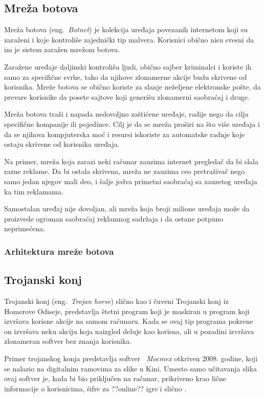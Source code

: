 \documentclass[a4paper]{article}
\begin{document}
\subsection{Mreža botova}

Mreža botova (eng.~{\em Botnet}) je kolekcija uređaja povezanih internetom koji su zaraženi i koje kontroliše zajednički tip malvera. Korisnici obično nisu svesni da im je sistem zaražen mrežom botova.

Zaražene uređaje daljinski kontrolišu ljudi, obično sajber kriminalci i koriste ih samo za specifične svrhe, tako da njihove zlonamerne akcije budu skrivene od korisnika. Mreže botova se obično koriste za slanje neželjene elektronske pošte, da prevare korisnike da posete sajtove koji generišu zlonamerni saobraćaj i druge.

Mreža botova traži i napada nedovoljno zaštićene uređaje, radije nego da cilja specifične kompanije ili pojedince. Cilj je da se mreža proširi na što više uređaja i da se njihova kompjuterska moć i resursi iskoriste za automatske radnje koje ostaju skrivene od korisnika uređaja.

Na primer, mreža koja zarazi neki računar zauzima internet pregledač da bi slala razne reklame. Da bi ostala skrivena, mreža ne zauzima ceo pretraživač nego samo jedan njegov mali deo, i šalje jedva primetni saobraćaj sa zauzetog uređaja ka tim reklamama.

Samostalan uređaj nije dovoljan, ali mreža koja broji milione uređaja može da proizvede ogroman saobraćaj reklamnog sadržaja i da ostane potpuno neprimećena.

\subsubsection{Arhitektura mreže botova}



\subsection{Trojanski konj}
\label{Odisej}

Trojanski konj (eng.~{\em Trojan horse}) slično kao i čuveni Trojanski konj iz Homerove Odiseje, predstavlja štetni program koji je maskiran u program koji izvršava korisne akcije na samom računaru. Kada se ovaj tip programa pokrene on izvršava neku akciju koja naizgled deluje kao korisna, ali u pozadini izvršava zlonameran softver bez znanja korisnika. \cite{trojanhorse}


Primer trojanskog konja predstavlja softver ~{\em Mocmex} otkriven 2008. godine, koji se nalazio na digitalnim ramovima za slike u Kini. Umesto samo učitavanja slika ovaj softver je, kada bi bio priključen na računar, prikriveno krao lične informacije o korisnicima, šifre za ??online?? igre i slično \cite{ethics}. 
\end{document}
